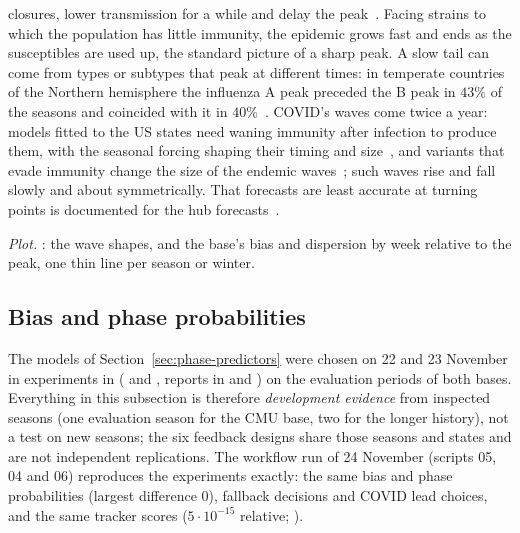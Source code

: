 \documentclass[11pt,a4paper]{article}
\theoremstyle{definition}
\theoremstyle{remark}
\begin{document}
\begin{itemize}[leftmargin=*,itemsep=3pt]
closures, lower transmission for a while and delay the
peak~\cite{ewing2017}. Facing strains to which the population has
little immunity, the epidemic grows fast and ends as the susceptibles
are used up, the standard picture of a sharp peak. A slow tail can come
from types or subtypes that peak at different times: in temperate
countries of the Northern hemisphere the influenza A peak preceded the B
peak in $43\%$ of the seasons and coincided with it in
$40\%$~\cite{caini2016}. COVID's waves come twice a year: models fitted to
the US states need waning immunity after infection to produce them,
with the seasonal forcing shaping their timing and size~\cite{rubin2026},
and variants that evade immunity change the size of the endemic
waves~\cite{otto2024}; such waves rise and fall slowly and about
symmetrically. That forecasts are least accurate at turning points is
documented for the hub forecasts~\cite{mathis2024}.
\end{itemize}
\emph{Plot.} : the
wave shapes, and the base's bias and dispersion by week relative to the
peak, one thin line per season or winter.

\subsection{Bias and phase probabilities}
\label{sec:results-phase-outside}
The models of Section~\ref{sec:phase-predictors} were chosen on 22 and 23
November in experiments in  (
and , reports in
 and
) on the evaluation periods of
both bases. Everything in this subsection is therefore \emph{development
evidence} from inspected seasons (one evaluation season for the CMU base,
two for the longer history), not a test on new seasons; the six feedback
designs share those seasons and states and are not independent
replications. The workflow run of 24 November (scripts 05, 04 and 06)
reproduces the experiments exactly: the same bias and phase probabilities
(largest difference 0), fallback decisions and COVID lead choices, and the
same tracker scores ($5\cdot10^{-15}$ relative;
).
\end{document}
